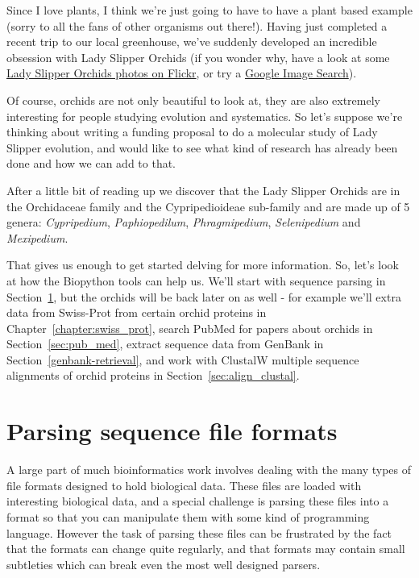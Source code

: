 \documentclass{report}
\begin{document}
Since I love plants, I think we're just going to have to have a plant based example (sorry to all the fans of other organisms out there!).  Having just completed a recent trip to our local greenhouse, we've suddenly developed an incredible obsession with Lady Slipper Orchids (if you wonder why, have a look at some \href{http://www.flickr.com/search/?q=lady+slipper+orchid&s=int&z=t}{Lady Slipper Orchids photos on Flickr}, or try a \href{http://images.google.com/images?q=lady%20slipper%20orchid}{Google Image Search}).

Of course, orchids are not only beautiful to look at, they are also extremely interesting for people studying evolution and systematics. So let's suppose we're thinking about writing a funding proposal to do a molecular study of Lady Slipper evolution, and would like to see what kind of research has already been done and how we can add to that.


After a little bit of reading up we discover that the Lady Slipper Orchids are in the Orchidaceae family and the Cypripedioideae sub-family and are made up of 5 genera:  \emph{Cypripedium}, \emph{Paphiopedilum}, \emph{Phragmipedium}, \emph{Selenipedium} and \emph{Mexipedium}.

That gives us enough to get started delving for more information. So, let's look at how the Biopython tools can help us.  We'll start with sequence parsing in Section~\ref{sec:sequence-parsing}, but the orchids will be back later on as well - for example we'll extra data from Swiss-Prot from certain orchid proteins in Chapter~\ref{chapter:swiss_prot}, search PubMed for papers about orchids in Section~\ref{sec:pub_med}, extract sequence data from GenBank in Section~\ref{genbank-retrieval}, and work with ClustalW multiple sequence alignments of orchid proteins in Section~\ref{sec:align_clustal}.

\section{Parsing sequence file formats}
\label{sec:sequence-parsing}

A large part of much bioinformatics work involves dealing with the many types of file formats designed to hold biological data. These files are loaded with interesting biological data, and a special challenge is parsing these files into a format so that you can manipulate them with some kind of programming language. However the task of parsing these files can be frustrated by the fact that the formats can change quite regularly, and that formats may contain small subtleties which can break even the most well designed parsers.
\end{document}
